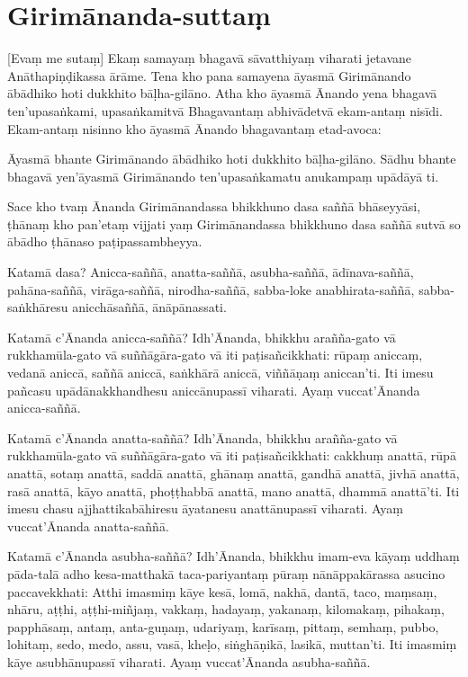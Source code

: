 \section{Girimānanda-suttaṃ}

[Evaṃ me sutaṃ] 
Ekaṃ samayaṃ bhagavā sāvatthiyaṃ viharati jetavane
Anāthapiṇḍikassa ārāme. Tena kho pana samayena āyasmā Girimānando ābādhiko hoti
dukkhito bāḷha-gilāno. Atha kho āyasmā Ānando yena bhagavā ten’upasaṅkami,
upasaṅkamitvā Bhagavantaṃ abhivādetvā ekam-antaṃ nisīdi. Ekam-antaṃ nisinno kho
āyasmā Ānando bhagavantaṃ etad-avoca:

Āyasmā bhante Girimānando ābādhiko hoti dukkhito bāḷha-gilāno. Sādhu bhante
bhagavā yen’āyasmā Girimānando ten’upasaṅkamatu anukampaṃ upādāyā ti.

Sace kho tvaṃ Ānanda Girimānandassa bhikkhuno dasa saññā bhāseyyāsi, ṭhānaṃ kho
pan’etaṃ vijjati yaṃ Girimānandassa bhikkhuno dasa saññā sutvā so ābādho ṭhānaso
paṭipassambheyya.

Katamā dasa? Anicca-saññā, anatta-saññā, asubha-saññā, ādīnava-saññā,
pahāna-saññā, virāga-saññā, nirodha-saññā, sabba-loke anabhirata-saññā,
sabba-saṅkhāresu anicchāsaññā, ānāpānassati.

Katamā c’Ānanda anicca-saññā? Idh’Ānanda, bhikkhu arañña-gato vā
rukkhamūla-gato vā suññāgāra-gato vā iti paṭisañcikkhati: rūpaṃ aniccaṃ, vedanā
aniccā, saññā aniccā, saṅkhārā aniccā, viññāṇaṃ aniccan’ti. Iti imesu pañcasu
upādānakkhandhesu aniccānupassī viharati. Ayaṃ vuccat’Ānanda anicca-saññā.

Katamā c’Ānanda anatta-saññā? Idh’Ānanda, bhikkhu arañña-gato vā
rukkhamūla-gato vā suññāgāra-gato vā iti paṭisañcikkhati: cakkhuṃ anattā, rūpā
anattā, sotaṃ anattā, saddā anattā, ghānaṃ anattā, gandhā anattā, jivhā anattā,
rasā anattā, kāyo anattā, phoṭṭhabbā anattā, mano anattā, dhammā anattā’ti. Iti
imesu chasu ajjhattikabāhiresu āyatanesu anattānupassī viharati. Ayaṃ
vuccat’Ānanda anatta-saññā.

Katamā c’Ānanda asubha-saññā? Idh’Ānanda, bhikkhu imam-eva kāyaṃ uddhaṃ
pāda-talā adho kesa-matthakā taca-pariyantaṃ pūraṃ nānāppakārassa asucino
paccavekkhati: Atthi imasmiṃ kāye kesā, lomā, nakhā, dantā, taco, maṃsaṃ,
nhāru, aṭṭhi, aṭṭhi-miñjaṃ, vakkaṃ, hadayaṃ, yakanaṃ, kilomakaṃ, pihakaṃ,
papphāsaṃ, antaṃ, anta-guṇaṃ, udariyaṃ, karīsaṃ, pittaṃ, semhaṃ, pubbo, lohitaṃ,
sedo, medo, assu, vasā, kheḷo, siṅghāṇikā, lasikā, muttan’ti. Iti imasmiṃ kāye
asubhānupassī viharati. Ayaṃ vuccat’Ānanda asubha-saññā.

